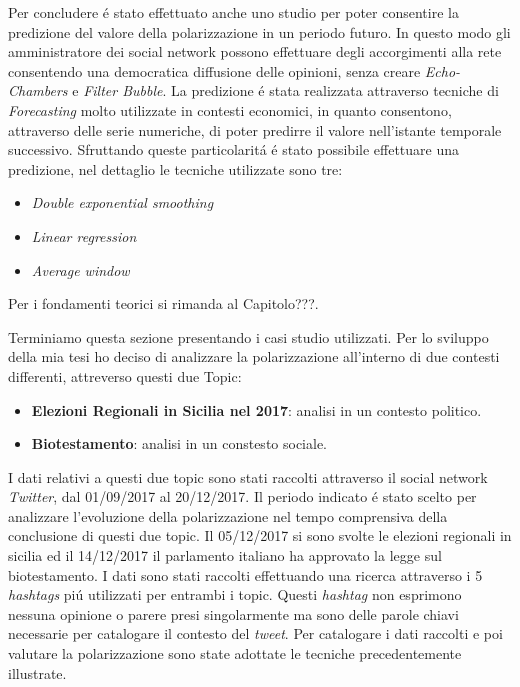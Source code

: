 Per concludere \'e stato effettuato anche uno studio per poter consentire la predizione del valore della polarizzazione in un periodo futuro. In questo modo gli amministratore dei social network possono effettuare degli accorgimenti alla rete consentendo una democratica diffusione delle opinioni, senza creare \textit{Echo-Chambers} e \textit{Filter Bubble}.  
La predizione \'e stata realizzata attraverso tecniche di \textit{Forecasting} molto utilizzate in contesti economici, in quanto consentono, attraverso delle serie numeriche, di poter predirre il valore nell'istante temporale successivo. Sfruttando queste particolarit\'a \'e stato possibile effettuare una predizione, nel dettaglio le tecniche utilizzate sono tre:
\begin{itemize}
\item \textit{Double exponential smoothing}
\item \textit{Linear regression}
\item \textit{Average window}
\end{itemize}
Per i fondamenti teorici si rimanda al Capitolo???.

Terminiamo questa sezione presentando i casi studio utilizzati. Per lo sviluppo della mia tesi ho deciso di analizzare  la polarizzazione all'interno di due contesti differenti, attreverso questi due Topic:
\begin{itemize}
\item \textbf{Elezioni Regionali in Sicilia nel 2017}: analisi in un contesto politico.
\item \textbf{Biotestamento}: analisi in un constesto sociale.
\end{itemize}
I dati relativi a questi due topic sono stati raccolti attraverso il social network \textit{Twitter}, dal 01/09/2017 al 20/12/2017. Il periodo indicato \'e stato scelto per analizzare l'evoluzione della polarizzazione nel tempo comprensiva della conclusione di questi due topic.
Il 05/12/2017 si sono svolte le elezioni regionali in sicilia ed il 14/12/2017 il parlamento italiano ha approvato la legge sul biotestamento.
I dati sono stati raccolti effettuando una ricerca attraverso i 5 \textit{hashtags} pi\'u utilizzati per entrambi i topic. Questi \textit{hashtag} non esprimono nessuna opinione o parere presi singolarmente ma sono delle parole chiavi necessarie per catalogare il contesto del \textit{tweet}. Per catalogare i dati raccolti e poi valutare la polarizzazione sono state adottate le tecniche precedentemente illustrate.

